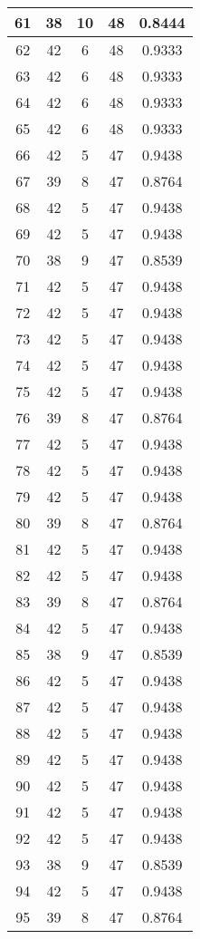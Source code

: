 \documentclass[letterpaper, 12pt]{article}
\begin{document}
\begin{longtable}{|c|c|c|c|c|}
61 & 38 & 10 & 48 & 0.8444 \\
\hline
62 & 42 & 6 & 48 & 0.9333 \\
\hline
63 & 42 & 6 & 48 & 0.9333 \\
\hline
64 & 42 & 6 & 48 & 0.9333 \\
\hline
65 & 42 & 6 & 48 & 0.9333 \\
\hline
66 & 42 & 5 & 47 & 0.9438 \\
\hline
67 & 39 & 8 & 47 & 0.8764 \\
\hline
68 & 42 & 5 & 47 & 0.9438 \\
\hline
69 & 42 & 5 & 47 & 0.9438 \\
\hline
70 & 38 & 9 & 47 & 0.8539 \\
\hline
71 & 42 & 5 & 47 & 0.9438 \\
\hline
72 & 42 & 5 & 47 & 0.9438 \\
\hline
73 & 42 & 5 & 47 & 0.9438 \\
\hline
74 & 42 & 5 & 47 & 0.9438 \\
\hline
75 & 42 & 5 & 47 & 0.9438 \\
\hline
76 & 39 & 8 & 47 & 0.8764 \\
\hline
77 & 42 & 5 & 47 & 0.9438 \\
\hline
78 & 42 & 5 & 47 & 0.9438 \\
\hline
79 & 42 & 5 & 47 & 0.9438 \\
\hline
80 & 39 & 8 & 47 & 0.8764 \\
\hline
81 & 42 & 5 & 47 & 0.9438 \\
\hline
82 & 42 & 5 & 47 & 0.9438 \\
\hline
83 & 39 & 8 & 47 & 0.8764 \\
\hline
84 & 42 & 5 & 47 & 0.9438 \\
\hline
85 & 38 & 9 & 47 & 0.8539 \\
\hline
86 & 42 & 5 & 47 & 0.9438 \\
\hline
87 & 42 & 5 & 47 & 0.9438 \\
\hline
88 & 42 & 5 & 47 & 0.9438 \\
\hline
89 & 42 & 5 & 47 & 0.9438 \\
\hline
90 & 42 & 5 & 47 & 0.9438 \\
\hline
91 & 42 & 5 & 47 & 0.9438 \\
\hline
92 & 42 & 5 & 47 & 0.9438 \\
\hline
93 & 38 & 9 & 47 & 0.8539 \\
\hline
94 & 42 & 5 & 47 & 0.9438 \\
\hline
95 & 39 & 8 & 47 & 0.8764 \\

\end{longtable}
\end{document}

